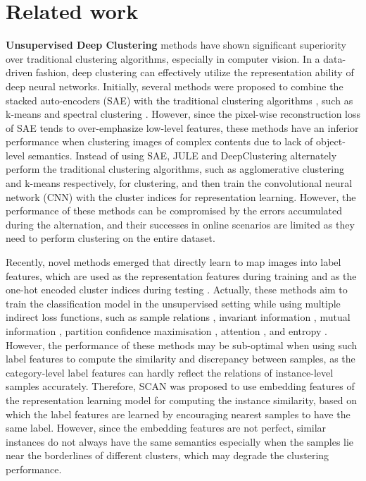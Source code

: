 \documentclass[10pt,twocolumn,letterpaper]{article}
\begin{document}
\section{Related work}

\noindent \textbf{Unsupervised Deep Clustering} methods have shown significant superiority over traditional clustering algorithms, especially in computer vision. In a data-driven fashion, deep clustering can effectively utilize the representation ability of deep neural networks. Initially, several methods were proposed to combine the stacked auto-encoders (SAE) with the traditional clustering algorithms \cite{Xie2016,LI2018161,DCN2016,DeepCluster2017,Zhang_2019_CVPR,DEPICT2017,VaDE2017,GMVAE,DASC2018}, such as k-means \cite{DEN2014, DMC2017} and spectral clustering \cite{DSCN2017}. However, since the pixel-wise reconstruction loss of SAE tends to over-emphasize  low-level features, these methods have an inferior performance when clustering images of complex contents due to lack of object-level semantics. 
Instead of using SAE, JULE \cite{Yang2016Joint} and DeepClustering \cite{vf2018} alternately perform the traditional clustering algorithms, such as agglomerative clustering and k-means respectively, for clustering, and then train the convolutional neural network (CNN) with the cluster indices for representation learning. However, the performance of these methods can be compromised by the errors accumulated during the alternation, and their successes in online scenarios are limited as they need to perform clustering on the entire dataset.

Recently, novel methods emerged that directly learn to map images into label features, which are used as the representation features during training and as the one-hot encoded cluster indices during testing \cite{DAIC2017, Wu_2019_ICCV, IIC2019, Huang_2020_CVPR, gatcluster, scan, cc}. Actually, these methods aim to train the classification model in the unsupervised setting while using multiple indirect loss functions, such as sample relations \cite{DAIC2017}, invariant information \cite{IIC2019, cc}, mutual information \cite{Wu_2019_ICCV}, partition confidence maximisation \cite{Huang_2020_CVPR}, attention \cite{gatcluster}, and entropy \cite{gatcluster, Huang_2020_CVPR, scan, cc}. However, the performance of these methods may be sub-optimal when using such label features to compute the similarity and discrepancy between samples, as the category-level label features can hardly reflect the relations of instance-level samples accurately.
Therefore, SCAN \cite{scan} was proposed to use embedding features of the representation learning model for computing the instance similarity, based on which the label features are learned by encouraging nearest samples to have the same label. However, since the embedding features are not perfect, similar instances do not always have the same semantics especially when the samples lie near the borderlines of different clusters, which may degrade the clustering performance.
\end{document}
